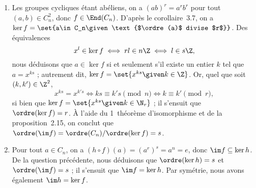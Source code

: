 
\begin{enumerate}
  \item %
    Les groupes cycliques étant abéliens, on a $(ab)^r = a^r b^r$ pour tout $(a, b)\in C_n^2$, donc $f\in\End(C_n)$.
    D'après le corollaire~3.7, on a $\ker f = \set{a\in C_n\given\text{$\ordre(a)$ divise $r$}}$.
    Des équivalences
    \[
      x^l\in\ker f
        \iff rl\in n\Z
        \iff l\in s\Z,
    \]
    nous déduisons que $a\in\ker f$ si et seulement s'il existe un entier $k$ tel que $a = x^{ks}$ ; autrement dit, $\ker f = \set{x^{ks} \given k\in\Z}$.
    Or, quel que soit $(k, k')\in\Z^2$,
    \[
      x^{ks} = x^{k's} \iff ks\equiv k's \pmod{n} \iff k\equiv k' \pmod{r},
    \]
    si bien que $\ker f = \set{x^{ks}\given k\in\N_r}$ ; il s'ensuit que $\ordre(\ker f) = r$.
    À l'aide du 1\ier~théorème d'isomorphisme et de la proposition~2.15, on conclut que $\ordre(\im f) = \ordre(C_n)/\ordre(\ker f) = s$.

  \item %
    Pour tout $a\in C_n$, on a $(h\circ f)(a) = (a^r)^s = a^n = e$, donc $\im f \subseteq\ker h$.
    De la question précédente, nous déduisons que $\ordre(\ker h) = s$ et  $\ordre(\im f) = s$ ;  il s'ensuit que $\im f = \ker h$.
    Par symétrie, nous avons également $\im h = \ker f$.
\end{enumerate}
